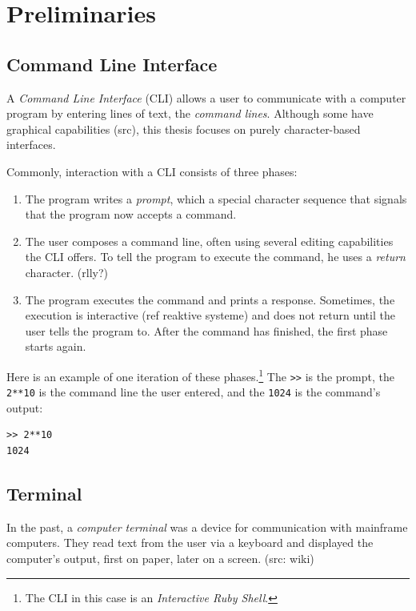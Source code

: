 \documentclass[paper=a4,twoside,abstract=on,cleardoublepage=empty,numbers=noenddot,toc=bib,12pt]{scrreprt}
\begin{document}
\chapter{Preliminaries}

\section{Command Line Interface}
\label{sec:cli}

A \emph{Command Line Interface} (\textsc{CLI}) allows a user to communicate with a computer program by entering lines of text, the \emph{command lines}. Although some have graphical capabilities (src), this thesis focuses on purely character-based interfaces.

Commonly, interaction with a \textsc{CLI} consists of three phases:

\begin{enumerate}
    \item The program writes a \emph{prompt}, which a special character sequence that signals that the program now accepts a command.
    \item The user composes a command line, often using several editing capabilities the CLI offers. To tell the program to execute the command, he uses a \emph{return} character. (rlly?)
    \item The program executes the command and prints a response. Sometimes, the execution is interactive (ref reaktive systeme) and does not return until the user tells the program to. After the command has finished, the first phase starts again.
\end{enumerate}

Here is an example of one iteration of these phases.\footnote{The \textsc{CLI} in this case is an \emph{Interactive Ruby Shell}.} The \texttt{>\->} is the prompt, the \texttt{2**10} is the command line the user entered, and the \texttt{1024} is the command's output:

\begin{lstlisting}
>> 2**10
1024
\end{lstlisting}

\section{Terminal}

In the past, a \emph{computer terminal} was a device for communication with mainframe computers. They read text from the user via a keyboard and displayed the computer's output, first on paper, later on a screen. (src: wiki)
\end{document}
